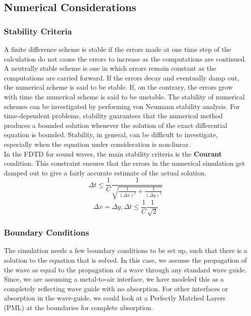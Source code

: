 \subsection{Numerical Considerations}
\subsubsection{Stability Criteria}
A finite difference scheme is stable if the errors made at one time step of the calculation do not cause the errors to increase as the computations are continued. A neutrally stable scheme is one in which errors remain constant as the computations are carried forward. If the errors decay and eventually damp out, the numerical scheme is said to be stable. If, on the contrary, the errors grow with time the numerical scheme is said to be unstable. The stability of numerical schemes can be investigated by performing von Neumann stability analysis. For time-dependent problems, stability guarantees that the numerical method produces a bounded solution whenever the solution of the exact differential equation is bounded. Stability, in general, can be difficult to investigate, especially when the equation under consideration is non-linear. \\
In the FDTD for sound waves, the main stability criteria is the \textbf{Courant} condition. This constraint ensures that the errors in the numerical simulation get damped out to give a fairly accurate  estimate of the actual solution.
\begin{equation}
\Delta t \leq \frac{1}{C} \frac{1}{\sqrt{\frac{1}{(\Delta x)^2}+\frac{1}{(\Delta y)^2}}}
\end{equation}
\begin{equation}
\Delta x = \Delta y,
\Delta t \leq \frac{1}{C} \frac{1}{\sqrt{2}}
\end{equation}
\subsubsection{Boundary Conditions}
The simulation needs a few boundary conditions to be set up, such that there is a solution to the equation that is solved. In this case, we assume the propagation of the wave as equal to the propagation of a wave through any standard wave guide. Since, we are assuming a metal-to-air interface, we have modeled this as a completely reflecting wave guide with no absorption. For other interfaces or absorption in the wave-guide, we could look at a Perfectly Matched Layers (PML) at the boundaries for complete absorption.


